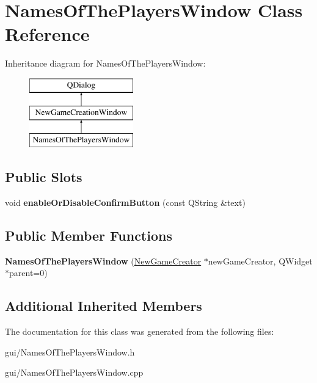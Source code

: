 \hypertarget{classNamesOfThePlayersWindow}{}\section{Names\+Of\+The\+Players\+Window Class Reference}
\label{classNamesOfThePlayersWindow}
Inheritance diagram for Names\+Of\+The\+Players\+Window\+:\begin{figure}[H]
\begin{center}
\leavevmode
\includegraphics[height=3.000000cm]{classNamesOfThePlayersWindow}
\end{center}
\end{figure}
\subsection*{Public Slots}
\begin{DoxyCompactItemize}
\item 
\mbox{\label{classNamesOfThePlayersWindow_ac52d684884838cb8f99a495b3c0f89d9}} 
void {\bfseries enable\+Or\+Disable\+Confirm\+Button} (const Q\+String \&text)
\end{DoxyCompactItemize}
\subsection*{Public Member Functions}
\begin{DoxyCompactItemize}
\item 
\mbox{\label{classNamesOfThePlayersWindow_a199b485baab3f42c072a33e845cd35cf}} 
{\bfseries Names\+Of\+The\+Players\+Window} (\hyperlink{classNewGameCreator}{New\+Game\+Creator} $\ast$new\+Game\+Creator, Q\+Widget $\ast$parent=0)
\end{DoxyCompactItemize}
\subsection*{Additional Inherited Members}


The documentation for this class was generated from the following files\+:\begin{DoxyCompactItemize}
\item 
gui/Names\+Of\+The\+Players\+Window.\+h\item 
gui/Names\+Of\+The\+Players\+Window.\+cpp\end{DoxyCompactItemize}
